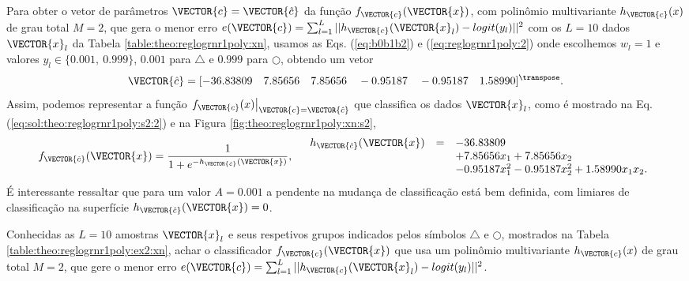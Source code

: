 \begin{SolutionT}\label{sol:theo:reglogrnr1poly:s2}
Para obter o vetor de parâmetros $\VECTOR{c}=\VECTOR{\hat{c}}$ da função $f_{\VECTOR{c}}(\VECTOR{x})$, 
com polinômio multivariante $h_{\VECTOR{c}}(x)$ de grau total $M=2$,
que gera o menor erro $e(\VECTOR{c}) =  \sum_{l=1}^{L} ||h_{\VECTOR{c}}(\VECTOR{x}_l)-logit(y_l)||^2$
com os $L=10$ dados $\VECTOR{x}_l$ da Tabela \ref{table:theo:reglogrnr1poly:xn},
usamos as Eqs. (\ref{eq:b0b1b2}) e  (\ref{eq:reglogrnr1poly:2}) 
onde escolhemos $w_l=1$ e valores $y_l \in \{0.001,~ 0.999\}$,
$0.001$ para $\bigtriangleup$ e $0.999$ para $\bigcirc$, 
obtendo um vetor 
\begin{equation}
\VECTOR{\hat{c}}=[-36.83809\quad 7.85656\quad 7.85656\quad -0.95187\quad -0.95187\quad 1.58990]^{\transpose}.                  
\end{equation}
Assim, podemos representar a função $\left.f_{\VECTOR{c}}(x)\right|_{\VECTOR{c}=\VECTOR{\hat{c}}}$ 
que classifica os dados $\VECTOR{x}_l$, 
como é mostrado na Eq. (\ref{eq:sol:theo:reglogrnr1poly:s2:2}) e na Figura \ref{fig:theo:reglogrnr1poly:xn:s2},
\begin{equation}\label{eq:sol:theo:reglogrnr1poly:s2:2}
f_{\VECTOR{\hat{c}}}(\VECTOR{x})= \frac{1}{1+e^{-h_{\VECTOR{\hat{c}}}(\VECTOR{x})}},
\quad
\begin{array}{lll}
h_{\VECTOR{\hat{c}}}(\VECTOR{x}) & = & -36.83809\\
                         ~ & ~ & +7.85656 x_1 +7.85656 x_2 \\
                         ~ & ~ & -0.95187 x_1^2 -0.95187  x_2^2 + 1.58990 x_1 x_2.\\
\end{array}
\end{equation}
É interessante ressaltar que para um valor $A=0.001$ a pendente na mudança de classificação está bem definida,
com limiares de classificação na superfície $h_{\VECTOR{\hat{c}}}(\VECTOR{x})=0$.
\end{SolutionT}


\begin{example}\label{ex2:theo:reglogrnr1poly}
Conhecidas as $L=10$ amostras $\VECTOR{x}_l$ e seus respetivos grupos indicados pelos símbolos $\bigtriangleup$ e $\bigcirc$, 
mostrados na Tabela \ref{table:theo:reglogrnr1poly:ex2:xn},
achar o classificador $f_{\VECTOR{c}}(\VECTOR{x})$ que usa um polinômio multivariante $h_{\VECTOR{c}}(x)$
de grau total $M=2$, 
que gere o menor erro $e(\VECTOR{c}) =  \sum_{l=1}^{L} ||h_{\VECTOR{c}}(\VECTOR{x}_l)-logit(y_l)||^2$.
\end{example}


